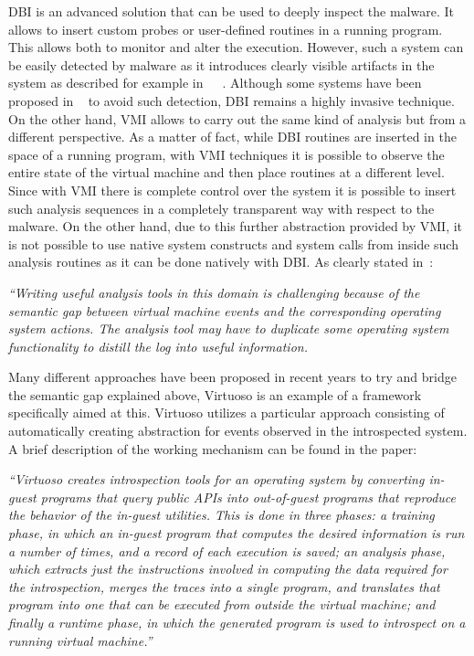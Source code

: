 DBI is an advanced solution that can be used to deeply inspect the malware. It allows to insert custom probes or user-defined routines in a running program. This allows both to monitor and alter the execution. However, such a system can be easily detected by malware as it introduces clearly visible artifacts in the system as described for example in~\cite{bruening}~\cite{corsec}~\cite{bots16}. Although some systems have been proposed in ~\cite{10.1007/978-3-319-60876-1_4} to avoid such detection, DBI remains a highly invasive technique. On the other hand, VMI allows to carry out the same kind of analysis but from a different perspective. As a matter of fact, while DBI routines are inserted in the space of a running program, with VMI techniques it is possible to observe the entire state of the virtual machine and then place routines at a different level. Since with VMI there is complete control over the system it is possible to insert such analysis sequences in a completely transparent way with respect to the malware. On the other hand, due to this further abstraction provided by VMI, it is not possible to use native system constructs and system calls from inside such analysis routines as it can be done natively with DBI. As clearly stated in~\cite{10.5555/874075.876409}:

\textit{``Writing useful analysis tools in this domain is challenging because of the semantic gap between virtual machine events and the corresponding operating system actions. The analysis tool may have to duplicate some operating system functionality to distill the log into useful information.}~\cite{10.5555/874075.876409}

Many different approaches have been proposed in recent years to try and bridge the semantic gap explained above, Virtuoso\cite{5958036} is an example of a framework specifically aimed at this. Virtuoso utilizes a particular approach consisting of automatically creating abstraction for events observed in the introspected system. A brief description of the working mechanism can be found in the paper:

\textit{``Virtuoso creates introspection tools for an operating system by converting in-guest programs that query public APIs into out-of-guest programs that reproduce the behavior of the in-guest utilities. This is done in three phases: a training phase, in which an in-guest program that computes the desired information is run a number of times, and a record of each execution is saved; an analysis phase, which extracts just the instructions involved in computing the data required for the introspection, merges the traces into a single program, and translates that program into one that can be executed from outside the virtual machine; and finally a runtime phase, in which the generated program is used to introspect on a running virtual machine.''}\cite{5958036}

